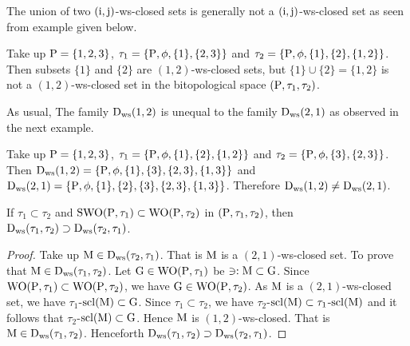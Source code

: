 \begin{rem}\label{rem7.2.25}
The union of two $(\mathrm{i}, \mathrm{j})$-ws-closed sets is generally not a $(\mathrm{i}, \mathrm{j})$-ws-closed set as seen from example given below.
\end{rem}

\begin{exm}\label{exm7. 2.26}
Take up $\mathrm{P}=\{1,2,3\}$, $\tau_1 =\{\mathrm{P}, \phi, \{1\},\{2, 3\}\}$ and $\tau_2 =\{\TSP, \phi, \{1\},\break \{2\}, \{1, 2\}\}$. Then subsets $\{1\}$ and $\{2\}$ are $(1, 2)$-ws-closed sets, but $\{1\}\cup \{2\}=\{1,2\}$ is not a $(1, 2)$-ws-closed set in the bitopological space $(\mathrm{P}, \tau_1, \tau_2 )$.
\end{exm}

\begin{rem}\label{rem7.2.27} 
As usual, The family $\mathrm{D}_{\mathrm{ws}} (1, 2)$ is unequal to the family $\mathrm{D}_{\mathrm{ws}} (2, 1)$ as observed in the next example.
\end{rem}

\begin{exm}\label{exm7.2.28}
Take up $\mathrm{P}= \{1,2,3\}$, $\tau_1 =\{\mathrm{P}, \phi, \{1\}, \{2\}, \{1, 2\}\}$ and $\tau_2 =\{\mathrm{P}, \phi, \{3\}, \{2, 3\}\}$. Then $\mathrm{D}_{\mathrm{ws}}(1, 2)=\{\mathrm{P}, \phi, \{1\}, \{3\},\{2,3\},\{1,3\}\}$ and $\mathrm{D}_{\mathrm{ws}} (2, 1)=\{\mathrm{P}, \phi, \{1\}, \{2\}, \{3\},\{2, 3\}, \{1,3\}\}$. Therefore $\mathrm{D}_{\mathrm{ws}} (1, 2)\neq \mathrm{D}_{\mathrm{ws}} (2, 1)$.
\end{exm}

\begin{thm}\label{thm7.2.29}
If $\tau_1 \subset \tau_2$ and $\mathrm{SWO}(\mathrm{P}, \tau_1) \subset \mathrm{WO}(\mathrm{P}, \tau_2 )$ in $(\mathrm{P}, \tau_1, \tau_2 )$, then $\mathrm{D}_{\mathrm{ws}} (\tau_1, \tau_2 ) \supset  \mathrm{D}_{\mathrm{ws}} (\tau_2,\tau_1 )$.
\end{thm}

\begin{proof}
Take up $\mathrm{M}\in \mathrm{D}_{\mathrm{ws}} (\tau_2, \tau_1 )$. That is $\mathrm{M}$ is a $(2, 1)$-ws-closed set. To prove that $\mathrm{M}\in \mathrm{D}_{\mathrm{ws}} (\tau_1,\tau_2 )$. Let $\mathrm{G}\in \mathrm{WO}(\mathrm{P}, \tau_1 )$ be $\ni: \mathrm{M} \subset \mathrm{G}$. Since $\mathrm{WO}(\mathrm{P}, \tau_1 ) \subset \mathrm{WO}(\mathrm{P}, \tau_2 )$, we have $\mathrm{G}\in \mathrm{WO}(\mathrm{P}, \tau_2 )$. As $\mathrm{M}$ is a $(2, 1)$-ws-closed set, we have $\tau_1$-$\mathrm{scl}(\mathrm{M}) \subset \mathrm{G}$. Since $\tau_1 \subset \tau_2$, we have $\tau_2$-$\mathrm{scl}(\mathrm{M}) \subset \tau_1$-$\mathrm{scl}(\mathrm{M})$ and it follows that $\tau_2$-$\mathrm{scl}(\mathrm{M}) \subset \mathrm{G}$. Hence $\mathrm{M}$ is $(1, 2)$-ws-closed. That is $\mathrm{M} \in \mathrm{D}_{\mathrm{ws}} (\tau_1, \tau_2 )$. Henceforth $\mathrm{D}_{\mathrm{ws}} (\tau_1, \tau_2 ) \supset  \mathrm{D}_{\mathrm{ws}} (\tau_2, \tau_1 )$.
\end{proof}

